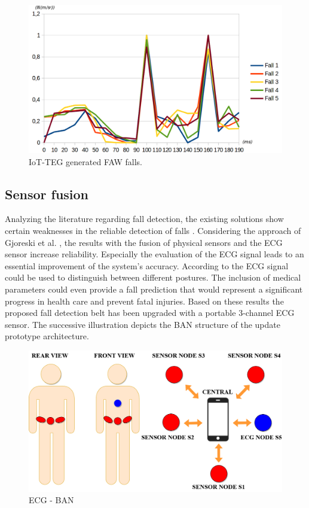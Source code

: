 \documentclass[10pt,journal,compsoc]{IEEEtran}
\begin{document}
\begin{figure}[!ht]
	\centering
	\includegraphics[scale=0.22]{Images/IoTTEGFAWGeneratedEvents}
	\caption[IoT-TEG generated FAW falls]{IoT-TEG generated FAW falls.}
	\label{fig:IoTTEGFAWGeneratedEvents}
\end{figure}

\subsection{Sensor fusion}
\label{subsec:sensorfusion}	
Analyzing the literature regarding fall detection, the existing solutions show certain weaknesses in the reliable detection of falls \cite{Igual2013, Li2009, Luder2009, Pannurat2014, jamsa2014fall}. Considering the approach of Gjoreski et al. \cite{Gjoreski2014}, the results with the fusion of physical sensors and the ECG sensor increase reliability. Especially the evaluation of the ECG signal leads to an essential improvement of the system's accuracy.  According to \cite{Gjoreski2014} the ECG signal could be used to distinguish between different postures. The inclusion of medical parameters could even provide a fall prediction that would represent a significant progress in health care and prevent fatal injuries. Based on these results the proposed fall detection belt has been upgraded with a portable 3-channel ECG sensor. The successive illustration depicts the BAN structure of the update prototype architecture.
\begin{figure}[!ht]
	\centering
	\includegraphics[scale=0.2]{Images/ECG-BAN.png}
	\caption[ECG - BAN]{ECG - BAN}
	\label{fig:ECGBAN}
\end{figure}
\end{document}
